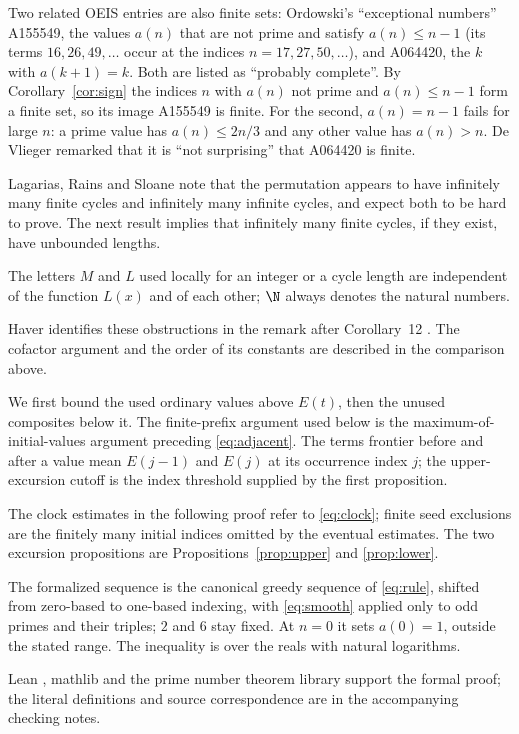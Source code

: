 Two related OEIS entries are also finite sets: Ordowski's ``exceptional
numbers'' A155549, the values $a(n)$ that are not prime and satisfy
$a(n)\leq n-1$ (its terms $16,26,49,\ldots$ occur at the indices
$n=17,27,50,\ldots$), and A064420, the $k$ with $a(k+1)=k$. Both are
listed as ``probably complete''. By Corollary~\ref{cor:sign} the indices
$n$ with $a(n)$ not prime and $a(n)\leq n-1$ form a finite set, so its
image A155549 is finite. For the
second, $a(n)=n-1$ fails for large $n$: a prime value has
$a(n)\leq2n/3$ and any other value has $a(n)>n$. De Vlieger
\cite{devlieger} remarked that it is ``not surprising'' that A064420
is finite.



Lagarias, Rains and Sloane \cite[Section~7]{lrs} note that the
permutation appears to have infinitely many finite cycles and
infinitely many infinite cycles, and expect both to be hard to prove.
The next result implies that infinitely many finite cycles, if they
exist, have unbounded lengths.

The letters $M$ and $L$ used locally for an integer
or a cycle length are independent of the function $L(x)$ and of each
other; $\N$ always denotes the natural numbers.

Haver identifies these obstructions in the remark after Corollary~12
\cite{haver}. The cofactor argument and the order of its constants
are described in the comparison above.

We first bound the used ordinary values above $E(t)$, then the unused
composites below it. The finite-prefix argument used below is the
maximum-of-initial-values argument preceding \eqref{eq:adjacent}.
The terms frontier before and after a value mean $E(j-1)$ and $E(j)$
at its occurrence index $j$; the upper-excursion cutoff is the index
threshold supplied by the first proposition.

The clock estimates in the following proof refer to \eqref{eq:clock};
finite seed exclusions are the finitely many initial indices omitted by
the eventual estimates. The two excursion propositions are
Propositions~\ref{prop:upper} and \ref{prop:lower}.

The formalized sequence is the canonical
greedy sequence of \eqref{eq:rule}, shifted from zero-based to one-based
indexing, with \eqref{eq:smooth} applied only to odd primes and their
triples; $2$ and $6$ stay fixed. At $n=0$ it sets $a(0)=1$, outside the
stated range. The inequality is over the reals with natural logarithms.

Lean \cite{lean}, mathlib \cite{mathlib} and the prime number theorem
library \cite{pntcode} support the formal proof; the literal definitions
and source correspondence are in the accompanying checking notes.

